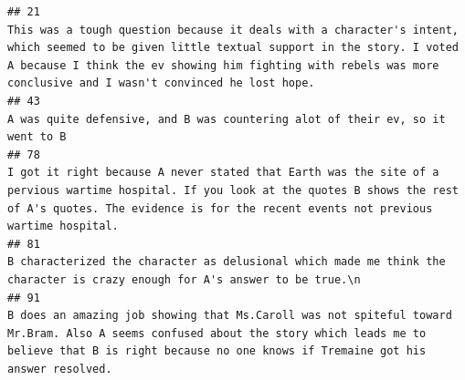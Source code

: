 \documentclass[
]{article}
\begin{document}
\begin{verbatim}
## 21                                                                                                                                                                                                                                                                                                                                      This was a tough question because it deals with a character's intent, which seemed to be given little textual support in the story. I voted A because I think the ev showing him fighting with rebels was more conclusive and I wasn't convinced he lost hope.
## 43                                                                                                                                                                                                                                                                                                                                                                                                                                                                                                                       A was quite defensive, and B was countering alot of their ev, so it went to B
## 78                                                                                                                                                                                                                                                                                                                                                                       I got it right because A never stated that Earth was the site of a pervious wartime hospital. If you look at the quotes B shows the rest of A's quotes. The evidence is for the recent events not previous wartime hospital. 
## 81                                                                                                                                                                                                                                                                                                                                                                                                                                                                          B characterized the character as delusional which made me think the character is crazy enough for A's answer to be true.\n
## 91                                                                                                                                                                                                                                                                                                                                                                             B does an amazing job showing that Ms.Caroll was not spiteful toward Mr.Bram. Also A seems confused about the story which leads me to believe that B is right because no one knows if Tremaine got his answer resolved.

\end{verbatim}
\end{document}
